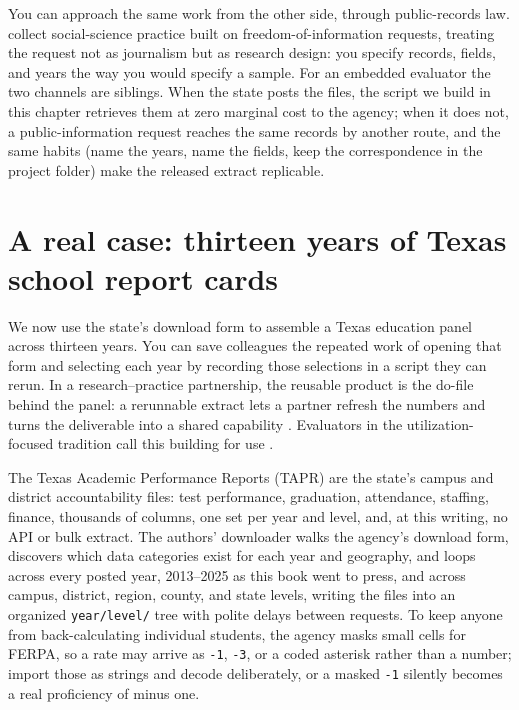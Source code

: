 \documentclass[
    a4paper,
    fontsize=10pt,
    twoside=true,
    numbers=noenddot,
]{kaobook}
\begin{document}
You can approach the same work from the other side, through public-records law. \textcite{walby2019foi} collect social-science practice built on freedom-of-information requests, treating the request not as journalism but as research design: you specify records, fields, and years the way you would specify a sample. For an embedded evaluator the two channels are siblings. When the state posts the files, the script we build in this chapter retrieves them at zero marginal cost to the agency; when it does not, a public-information request reaches the same records by another route, and the same habits (name the years, name the fields, keep the correspondence in the project folder) make the released extract replicable.

\section{A real case: thirteen years of Texas school report cards}
We now use the state's download form to assemble a Texas education panel across thirteen years. You can save colleagues the repeated work of opening that form and selecting each year by recording those selections in a script they can rerun. In a research--practice partnership, the reusable product is the do-file behind the panel: a rerunnable extract lets a partner refresh the numbers and turns the deliverable into a shared capability \parencite{coburn2016partnerships}. Evaluators in the utilization-focused tradition call this building for use \parencite{patton2008utilization}.

The Texas Academic Performance Reports (TAPR) are the state's campus and district accountability files: test performance, graduation, attendance, staffing, finance, thousands of columns, one set per year and level, and, at this writing, no API or bulk extract. The authors' downloader walks the agency's download form, discovers which data categories exist for each year and geography, and loops across every posted year, 2013--2025 as this book went to press, and across campus, district, region, county, and state levels, writing the files into an organized \texttt{year/level/} tree with polite delays between requests. To keep anyone from back-calculating individual students, the agency masks small cells for FERPA, so a rate may arrive as \texttt{-1}, \texttt{-3}, or a coded asterisk rather than a number; import those as strings and decode deliberately, or a masked \texttt{-1} silently becomes a real proficiency of minus one.
\end{document}
